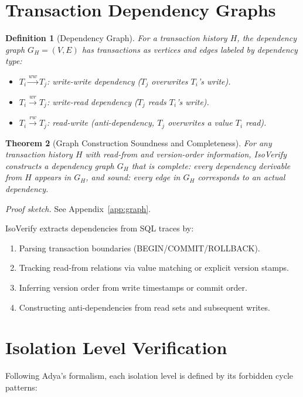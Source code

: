 \documentclass[11pt]{article}
\newtheorem{theorem}{Theorem}
\newtheorem{definition}[theorem]{Definition}
\begin{document}
\section{Transaction Dependency Graphs}
\label{sec:graphs}

\begin{definition}[Dependency Graph]
For a transaction history $H$, the dependency graph $G_H = (V, E)$ has
transactions as vertices and edges labeled by dependency type:
\begin{itemize}
\item $T_i \xrightarrow{ww} T_j$: write-write dependency ($T_j$ overwrites
  $T_i$'s write).
\item $T_i \xrightarrow{wr} T_j$: write-read dependency ($T_j$ reads $T_i$'s
  write).
\item $T_i \xrightarrow{rw} T_j$: read-write (anti-dependency, $T_j$
  overwrites a value $T_i$ read).
\end{itemize}
\end{definition}

\begin{theorem}[Graph Construction Soundness and Completeness]
\label{thm:graph}
For any transaction history $H$ with read-from and version-order information,
IsoVerify constructs a dependency graph $G_H$ that is \emph{complete}: every
dependency derivable from $H$ appears in $G_H$, and \emph{sound}: every edge
in $G_H$ corresponds to an actual dependency.
\end{theorem}
\noindent\emph{Proof sketch.}  See Appendix~\ref{app:graph}.

IsoVerify extracts dependencies from SQL traces by:
\begin{enumerate}
\item Parsing transaction boundaries (BEGIN/COMMIT/ROLLBACK).
\item Tracking read-from relations via value matching or explicit version stamps.
\item Inferring version order from write timestamps or commit order.
\item Constructing anti-dependencies from read sets and subsequent writes.
\end{enumerate}

\section{Isolation Level Verification}
\label{sec:checking}

Following Adya's formalism, each isolation level is defined by its forbidden
cycle patterns:
\end{document}
